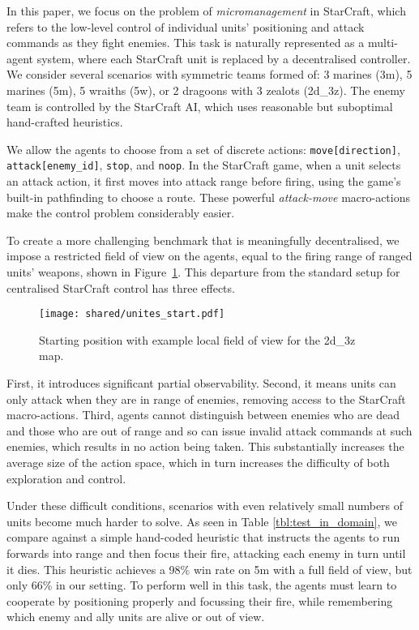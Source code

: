 \documentclass[letterpaper]{article}
\begin{document}
In this paper, we focus on the problem of \emph{micromanagement} in StarCraft,
which refers to the low-level control of individual units' positioning and
attack commands as they fight enemies. This task is naturally represented as a
multi-agent system, where each StarCraft unit is replaced by a decentralised
controller. We consider several scenarios with symmetric teams formed of: 3
marines (3m), 5 marines (5m), 5 wraiths (5w), or 2 dragoons with 3 zealots 
(2d\_3z). The enemy team is controlled by the StarCraft AI, which uses 
reasonable but suboptimal hand-crafted heuristics.

We allow the agents to choose from a set of discrete actions:
\texttt{move[direction]}, \texttt{attack[enemy\_id]}, \texttt{stop}, and
\texttt{noop}. In the StarCraft game, when a unit selects an attack action, it
first moves into attack range before firing, using the game's built-in
pathfinding to choose a route. These powerful \emph{attack-move} macro-actions
make the control problem considerably easier.


To create a more challenging benchmark that is meaningfully decentralised, we
impose a restricted field of view on the agents, equal to the firing range of
ranged units' weapons, shown in Figure~\ref{fig:setup}. This departure from the standard setup for
centralised StarCraft control has three effects.

\begin{figure}[h!]
    \begin{center}
        \texttt{[image: shared/unites\_start.pdf]}
    \end{center}
    \caption{Starting position with example local field of view for the 2d\_3z map.}
    \label{fig:setup}
\end{figure}

First, it introduces significant partial observability. Second, it means units
can only attack when they are in range of enemies, removing access to the
StarCraft macro-actions. Third, agents cannot distinguish between enemies who
are dead and those who are out of range and so can issue invalid attack commands
at such enemies, which results in no action being taken. This substantially
increases the average size of the  action space, which in turn increases the
difficulty of both exploration and control.

Under these difficult conditions, scenarios with even relatively small numbers
of units become much harder to solve. As seen in Table \ref{tbl:test_in_domain},
we compare against a simple hand-coded heuristic that instructs the agents to
run forwards into range and then focus their fire, attacking each enemy in turn
until it dies. This heuristic achieves a 98\% win rate on 5m with a full field
of view, but only 66\% in our setting. To perform well in this task, the agents
must learn to cooperate by positioning properly and focussing their fire,
while remembering which enemy and ally units are alive or out of
view.
\end{document}
